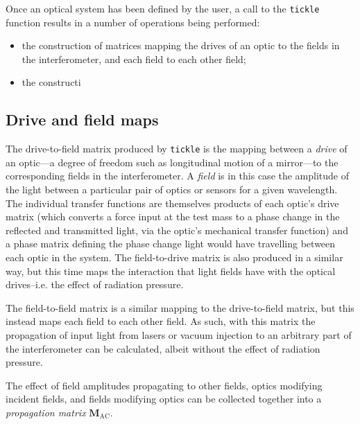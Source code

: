 Once an optical system has been defined by the user, a call to the \lstinline!tickle! function results in a number of operations being performed:
\begin{itemize}
  \item the construction of matrices mapping the drives of an optic to the fields in the interferometer, and each field to each other field;
  \item the constructi
\end{itemize}

\subsection{Drive and field maps}
The drive-to-field matrix produced by \lstinline!tickle! is the mapping between a \emph{drive} of an optic---a degree of freedom such as longitudinal motion of a mirror---to the corresponding fields in the interferometer. A \emph{field} is in this case the amplitude of the light between a particular pair of optics or sensors for a given wavelength. The individual transfer functions are themselves products of each optic's drive matrix (which converts a force input at the test mass to a phase change in the reflected and transmitted light, via the optic's mechanical transfer function) and a phase matrix defining the phase change light would have travelling between each optic in the system. The field-to-drive matrix is also produced in a similar way, but this time maps the interaction that light fields have with the optical drives--i.e. the effect of radiation pressure.

The field-to-field matrix is a similar mapping to the drive-to-field matrix, but this instead maps each field to each other field. As such, with this matrix the propagation of input light from lasers or vacuum injection to an arbitrary part of the interferometer can be calculated, albeit without the effect of radiation pressure.

The effect of field amplitudes propagating to other fields, optics modifying incident fields, and fields modifying optics can be collected together into a \emph{propagation matrix} $\mathbf{M}_{\text{AC}}$.

